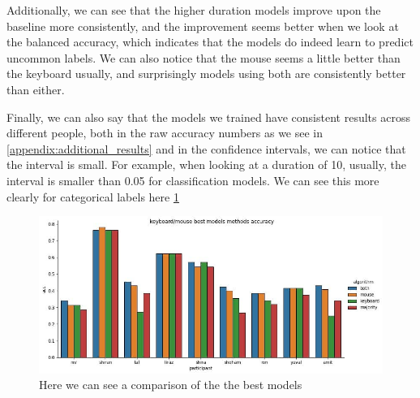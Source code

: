 \documentclass[../main.tex]{subfiles}
\begin{document}
    Additionally, we can see that the higher duration models improve upon the baseline more consistently, 
    and the improvement seems better when we look at the balanced accuracy, which indicates that the models do indeed learn to predict uncommon labels. 
    We can also notice that the mouse seems a little better than the keyboard usually, and surprisingly models using both are consistently better than either. 

    Finally, we can also say that the models we trained have consistent results across different people, both in the raw accuracy numbers as we see in 
    \ref{appendix:additional_results} and in the confidence intervals, we can notice that the interval is small. For example, when looking at a duration of 10, 
    usually, the interval is smaller than 0.05 for classification models.
    We can see this more clearly for categorical labels here \ref{fig:categorical_kbm}

    \begin{figure}
        \centering
        \includegraphics[width=14cm]{figures/results/categorical_kbm}   
        \caption{Here we can see a comparison of the the best models}
        \label{fig:categorical_kbm} 
    \end{figure}
\end{document}
